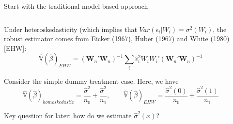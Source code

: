\documentclass[notes,11pt, aspectratio=169]{beamer}
\newenvironment{wideitemize}{\itemize\addtolength{\itemsep}{10pt}}{\enditemize}
\begin{document}
\begin{frame}{Start with the traditional model-based approach}
\begin{columns}[T] %
\begin{column}{.8\textwidth}
  \begin{wideitemize}
  \item Under heteroskedasticity (which implies that $Var(\epsilon_{i} | W_{i}) = \sigma^{2}(W_{i})$, the robust estimator comes from Eicker (1967), Huber (1967) and White (1980) [EHW]:
    \begin{equation*}
      \hat{\mathbb{V}}(\hat{\beta})_{EHW} = (\mathbf{W}_{n}'\mathbf{W}_{n})^{-1}\sum_{i}\hat{\epsilon}_{i}^{2}W_{i}W_{i}'(\mathbf{W}_{n}'\mathbf{W}_{n})^{-1}
    \end{equation*}
  \item Consider the simple dummy treatment case. Here, we have
    \begin{equation*}
           \hat{\mathbb{V}}(\hat{\beta})_{homoskedastic} = \frac{\hat{\sigma}^{2}}{n_{0}} + \frac{\hat{\sigma}^{2}}{n_{1}}, \qquad \hat{\mathbb{V}}(\hat{\beta})_{EHW} = \frac{\hat{\sigma}^{2}(0)}{n_{0}} + \frac{\hat{\sigma}^{2}(1)}{n_{1}}
         \end{equation*}
       \item Key question for later: how do we estimate $\hat{\sigma}^{2}(x)$?
  \end{wideitemize}
  \end{column}%
  \hfill%
  \begin{column}{.5\textwidth}
  \end{column}
\end{columns}
  
\end{frame}
\end{document}

